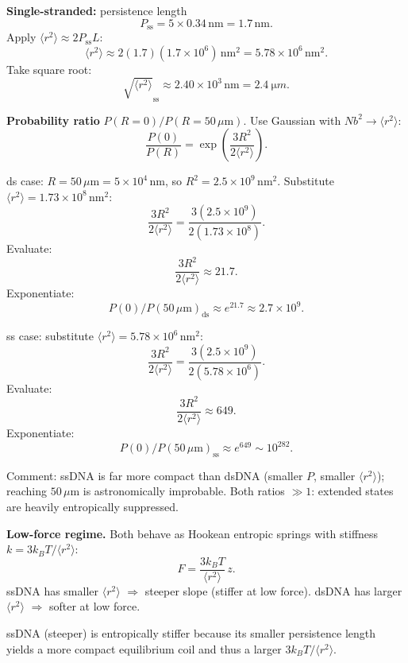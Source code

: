 \documentclass[11pt]{article}
\begin{document}
\textbf{Single-stranded:} persistence length
\[ P_\text{ss}=5\times 0.34\,\text{nm}=1.7\,\text{nm}. \]
Apply $\langle r^{2}\rangle\approx 2P_\text{ss}L$:
\[ \langle r^{2}\rangle\approx 2(1.7)(1.7\times 10^{6})\,\text{nm}^{2}=5.78\times 10^{6}\,\text{nm}^{2}. \]
Take square root:
\[ \boxed{\;\sqrt{\langle r^{2}\rangle}_{\text{ss}}\approx 2.40\times 10^{3}\,\text{nm}=\SI{2.4}{\micro m}.\;} \]

\textbf{Probability ratio} $P(R{=}0)/P(R{=}50\,\mu\text{m})$. Use Gaussian with $Nb^{2}\to\langle r^{2}\rangle$:
\[ \frac{P(0)}{P(R)}=\exp\!\left(\frac{3R^{2}}{2\langle r^{2}\rangle}\right). \]

ds case: $R=50\,\mu\text{m}=5\times 10^{4}\,\text{nm}$, so $R^{2}=2.5\times 10^{9}\,\text{nm}^{2}$. Substitute $\langle r^{2}\rangle=1.73\times 10^{8}\,\text{nm}^{2}$:
\[ \frac{3R^{2}}{2\langle r^{2}\rangle}=\frac{3(2.5\times 10^{9})}{2(1.73\times 10^{8})}. \]
Evaluate:
\[ \frac{3R^{2}}{2\langle r^{2}\rangle}\approx 21.7. \]
Exponentiate:
\[ \boxed{\;P(0)/P(50\,\mu\text{m})_\text{ds}\approx e^{21.7}\approx 2.7\times 10^{9}.\;} \]

ss case: substitute $\langle r^{2}\rangle=5.78\times 10^{6}\,\text{nm}^{2}$:
\[ \frac{3R^{2}}{2\langle r^{2}\rangle}=\frac{3(2.5\times 10^{9})}{2(5.78\times 10^{6})}. \]
Evaluate:
\[ \frac{3R^{2}}{2\langle r^{2}\rangle}\approx 649. \]
Exponentiate:
\[ \boxed{\;P(0)/P(50\,\mu\text{m})_\text{ss}\approx e^{649}\sim 10^{282}.\;} \]

Comment: ssDNA is far more compact than dsDNA (smaller $P$, smaller $\langle r^{2}\rangle$); reaching $50\,\mu$m is astronomically improbable. Both ratios $\gg 1$: extended states are heavily entropically suppressed.

\textbf{Low-force regime.} Both behave as Hookean entropic springs with stiffness $k=3k_BT/\langle r^{2}\rangle$:
\[ F=\frac{3k_B T}{\langle r^{2}\rangle}\,z. \]
ssDNA has smaller $\langle r^{2}\rangle$ $\Rightarrow$ steeper slope (stiffer at low force). dsDNA has larger $\langle r^{2}\rangle$ $\Rightarrow$ softer at low force.

\begin{center}
\end{center}

ssDNA (steeper) is entropically stiffer because its smaller persistence length yields a more compact equilibrium coil and thus a larger $3k_BT/\langle r^{2}\rangle$.
\end{document}
